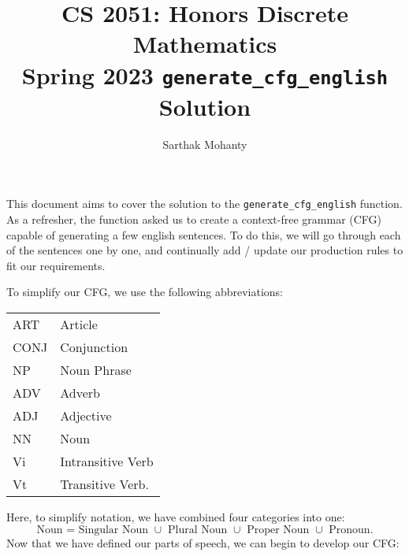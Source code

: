\documentclass{article}
\title{\vspace{-1cm}CS 2051: Honors Discrete Mathematics \\Spring 2023 \texttt{generate\_cfg\_english} Solution}
\author{Sarthak Mohanty }
\date{}
\begin{document}
\maketitle

This document aims to cover the solution to the \lstinline{generate_cfg_english} function. As a refresher, the function asked us to create a context-free grammar (CFG) capable of generating a few english sentences. To do this, we will go through each of the sentences one by one, and continually add / update our production rules to fit our requirements.

\vspace{2mm}
To simplify our CFG, we use the following abbreviations:
\begin{center}
\begin{tabular}{l@{\hskip 1cm}l}
    ART & Article \\
    CONJ & Conjunction \\
    NP & Noun Phrase \\
    ADV & Adverb \\
    ADJ & Adjective \\
    NN & Noun \\
    Vi & Intransitive Verb \\
    Vt & Transitive Verb.
\end{tabular}
\end{center}
Here, to simplify notation, we have combined four categories into one: $$\text{Noun = Singular Noun $\cup$ Plural Noun $\cup$ Proper Noun $\cup$ Pronoun}.$$ Now that we have defined our parts of speech, we can begin to develop our CFG:
\end{document}
